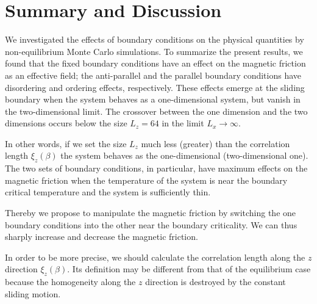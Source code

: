 \chapter{Summary and Discussion}\label{chap:Summary}

We investigated the effects of boundary conditions on the physical quantities by non-equilibrium Monte Carlo simulations. To summarize the present results, we found that the fixed boundary conditions have an effect on the magnetic friction as an effective field; the anti-parallel and the parallel boundary conditions have disordering and ordering effects, respectively. These effects emerge at the sliding boundary when the system behaves as a one-dimensional system, but vanish in the two-dimensional limit. The crossover between the one dimension and the two dimensions occurs below the size $L_{z}=64$ in the limit $L_{x}\to\infty$. 

In other words, if we set the size $L_{z}$ much less (greater) than the correlation length $\xi_{z}(\beta)$ the system behaves as the one-dimensional (two-dimensional one). The two sets of boundary conditions, in particular, have maximum effects on the magnetic friction when the temperature of the system is near the boundary critical temperature and the system is sufficiently thin.

Thereby we propose to manipulate the magnetic friction by switching the one boundary conditions into the other near the boundary criticality. We can thus sharply increase and decrease the magnetic friction. 

In order to be more precise, we should calculate the correlation length along the $z$ direction $\xi_{z}(\beta)$. Its definition may be different from that of the equilibrium case because the homogeneity along the $z$ direction is destroyed by the constant sliding motion.

